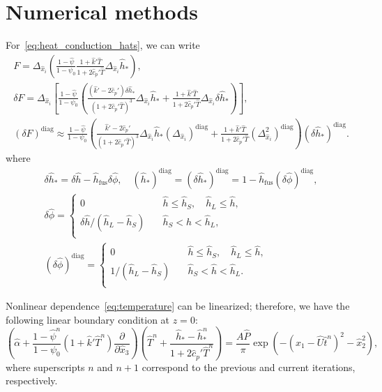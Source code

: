 \documentclass{article}
\newcommand{\pder}[2][]{\frac{\partial#1}{\partial#2}}
\newcommand{\dder}[2][]{\Delta_{#2}#1}
\newcommand{\pert}[1]{\delta#1}
\newcommand{\diag}[1]{\left(#1\right)^\mathrm{diag}}
\newcommand{\fusion}[1]{{#1}_\mathrm{fus}}
\begin{document}
\section{Numerical methods}

For~\eqref{eq:heat_conduction_hats}, we can write
\begin{gather}
    F = \dder{\hat{x}_i}\left(
        \frac{1 - \hat{\psi}}{1 - \psi_0}
	    \frac{1 + \hat{k}'\hat{T}}{1 + 2\hat{c}_p'\hat{T}}
	    \dder[\hat{h}_*]{\hat{x}_i}
	\right), \\
    \pert{F} = \dder{\hat{x}_i}\left[ \frac{1 - \hat{\psi}}{1 - \psi_0} \left(
	    \frac{(\hat{k}' - 2\hat{c}_p')\pert{\hat{h}_*}}{(1 + 2\hat{c}_p'\hat{T})^3}
	     \dder[\hat{h}_*]{\hat{x}_i}
	    +
	    \frac{1 + \hat{k}'\hat{T}}{1 + 2\hat{c}_p'\hat{T}}
	    \dder[\pert{\hat{h}_*}]{\hat{x}_i}
	\right)\right], \\
    \diag{\pert{F}} \approx \frac{1 - \hat{\psi}}{1 - \psi_0} \left(
	    \frac{\hat{k}' - 2\hat{c}_p'}{(1 + 2\hat{c}_p'\hat{T})^3} \dder[\hat{h}_*]{\hat{x}_i} \diag{\dder{\hat{x}_i}}
	    +
	    \frac{1 + \hat{k}'\hat{T}}{1 + 2\hat{c}_p'\hat{T}}
	    \diag{\dder{\hat{x}_i}^2}
	\right) \diag{\pert{\hat{h}_*}}.
\end{gather}
where
\begin{gather}
    \pert{\hat{h}_*} = \pert{\hat{h}} - \fusion{\hat{h}}\pert{\hat\phi}, \quad
    \diag{\hat{h}_*} = \diag{\pert{\hat{h}_*}} = 1 - \fusion{\hat{h}}\diag{\pert{\hat\phi}}, \\
	\pert{\hat{\phi}} = \begin{cases}
        0 & \quad \hat{h} \leq \hat{h}_S, \quad \hat{h}_L \leq \hat{h}, \\
        \pert{\hat{h}}/(\hat{h}_L-\hat{h}_S) & \quad \hat{h}_S < \hat{h} < \hat{h}_L, \\
    \end{cases} \label{eq:pert_phi_h}\\
	\diag{\pert{\hat{\phi}}} = \begin{cases}
        0 & \quad \hat{h} \leq \hat{h}_S, \quad \hat{h}_L \leq \hat{h}, \\
        1/(\hat{h}_L-\hat{h}_S) & \quad \hat{h}_S < \hat{h} < \hat{h}_L. \\
    \end{cases} \label{eq:pert_phi_h_diag}
\end{gather}

Nonlinear dependence~\eqref{eq:temperature} can be linearized; therefore, we have the following linear boundary condition at \(z=0\):
\begin{equation}\label{eq:bc_linearized}
	\left( \hat{\alpha} + \frac{1 - \hat{\psi}^n}{1 - \psi_0}\left(1 + \hat{k}'\hat{T}^n\right)\pder{\hat{x}_3}\right)
	    \left( \hat{T}^n + \frac{\hat{h}_* - \hat{h}_*^n}{1+2\hat{c}_p'\hat{T}^n} \right)
	    = \frac{A\hat{P}}{\pi}\exp\left(-(\hat{x}_1-\hat{U}\hat{t}^n)^2 - \hat{x}_2^2\right),
\end{equation}
where superscripts \(n\) and \(n+1\) correspond to the previous and current iterations, respectively.
\end{document}
